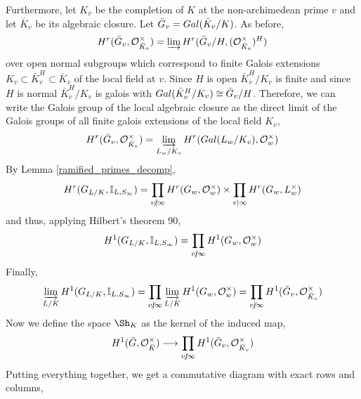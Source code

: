\documentclass[12pt]{extarticle}
\begin{document}
Furthermore, let $K_v$ be the completion of $K$ at the non-archimedean prime $v$ and let $\bar{K}_v$ be its algebraic closure. Let $\bar{G}_v = Gal \small(\bar{K}_v / K \small)$. As before,   
\[ H^r(\bar{G}_v, \mathcal{O}_{\bar{K}_v}^\times) = \varinjlim H^r(\bar{G}_v / H, (\mathcal{O}_{\bar{K}_v}^\times)^H) \]
over open normal subgroups which correspond to finite Galois extensions $K_v \subset \bar{K}_v^H \subset \bar{K}_v$ of the local field at $v$. Since $H$ is open $\bar{K}_v^H / K_v$ is finite and since $H$ is normal $\bar{K}_v^H / K_v$ is galois with $Gal \small(\bar{K}_v^H /K_v \small) \cong \bar{G}_v / H$. Therefore, we can write the Galois group of the local algebraic closure as the direct limit of the Galois groups of all finite galois extensions of the local field $K_v$,
\[ H^r(\bar{G}_v, \mathcal{O}_{\bar{K}_v}^\times) = \varinjlim_{L_w / K_v} H^r(Gal \small(L_w/K_v \small), \mathcal{O}_{w}^\times)  \]
By Lemma \ref{ramified_primes_decomp},
\[ H^r( G_{L/K}, \sidele{L}{S_{\infty}}) = \prod_{v \ndivides \infty} H^r(G_w, \ints{w}^\times) \times \prod_{v \divides \infty} H^r(G_w, L_w^\times) \]
and thus, applying Hilbert's theorem 90,
\[ H^1( G_{L/K}, \sidele{L}{S_{\infty}}) = \prod_{v \ndivides \infty} H^1(G_w, \ints{w}^\times)\]
Finally,
\[ \varinjlim_{L/K} H^1(G_{L/K}, \sidele{L}{S_{\infty}}) = \prod_{v \ndivides \infty} \varinjlim_{L/K} H^1(G_w, \ints{w}^\times) = \prod_{v \ndivides \infty}  H^1(\bar{G}_v, \ints{\bar{K}_v}^\times)
\]
Now we define the space $\Sh_K$ as the kernel of the induced map,
\[ H^1(\bar{G}, \ints{\bar{K}}^\times) \longrightarrow \prod_{v \ndivides \infty} H^1(\bar{G}_v, \ints{\bar{K}_v}^\times) \] 
Putting everything together, we get a commutative diagram with exact rows and columns,
\begin{center}
\end{center}
\end{document}
